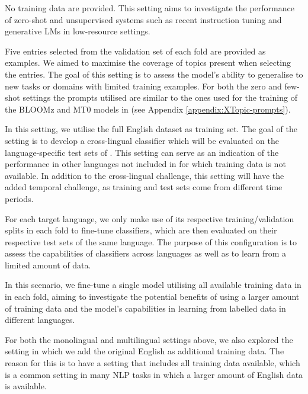  No training data are provided. This setting aims to investigate the performance of zero-shot and unsupervised systems such as recent instruction tuning \cite{chung2024scaling} and generative \acp{LM} \cite{bubeck2023sparks} in low-resource settings.

 Five entries selected from the validation set of each fold are provided as examples. We aimed to maximise the coverage of topics present when selecting the entries. The goal of this setting is to assess the model's ability to generalise to new tasks or domains with limited training examples. For both the zero and few-shot settings the prompts utilised are similar to the ones used for the training of the BLOOMz and MT0 models in  \citet{muennighoff2022crosslingual} (see Appendix \ref{appendix:XTopic-prompts}).

 In this setting, we utilise the full English {\TweetTopic} dataset \cite{antypas2022twitter} as training set. The goal of the setting is to develop a cross-lingual classifier which will be evaluated on the language-specific test sets of {\XTOPIC}. This setting can serve as an indication of the performance in other languages not included in {\XTOPIC} for which training data is not available. In addition to the cross-lingual challenge, this setting will have the added temporal challenge, as training and test sets come from different time periods.

 For each target language, we only make use of its respective training/validation splits in each fold to fine-tune classifiers, which are then evaluated on their respective test sets of the same language. The purpose of this configuration is to assess the capabilities of classifiers across languages as well as to learn from a limited amount of data.


 In this scenario, we fine-tune a single model utilising all available training data in {\XTOPIC} in each fold, aiming to investigate the potential benefits of using a larger amount of training data and the model's capabilities in learning from labelled data in different languages.

For both the monolingual and multilingual settings above, we also explored the setting in which we add the original English {\TweetTopic} as additional training data. The reason for this is to have a setting that includes all training data available, which is a common setting in many NLP tasks in which a larger amount of English data is available.

